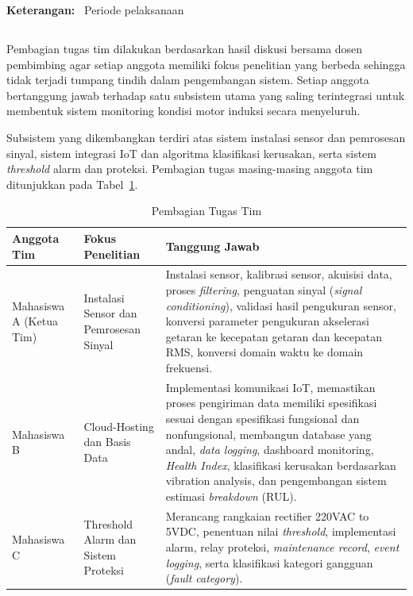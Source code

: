 \documentclass{elsinta}
\begin{document}
\noindent\textbf{Keterangan:} \colorbox{ganttblue}{\textcolor{white}{\phantom{XX}}} \, Periode pelaksanaan

\subsection{\TeamDivisionTitle}
Pembagian tugas tim dilakukan berdasarkan hasil diskusi bersama dosen pembimbing agar setiap anggota memiliki fokus penelitian yang berbeda sehingga tidak terjadi tumpang tindih dalam pengembangan sistem. Setiap anggota bertanggung jawab terhadap satu subsistem utama yang saling terintegrasi untuk membentuk sistem monitoring kondisi motor induksi secara menyeluruh.

Subsistem yang dikembangkan terdiri atas sistem instalasi sensor dan pemrosesan sinyal, sistem integrasi IoT dan algoritma klasifikasi kerusakan, serta sistem \textit{threshold} alarm dan proteksi. Pembagian tugas masing-masing anggota tim ditunjukkan pada Tabel~\ref{tab:pembagian_tugas}.

\begin{table}[H]
\centering
\caption{Pembagian Tugas Tim}
\label{tab:pembagian_tugas}


\begin{tabular}{|p{3cm}|p{4cm}|p{7cm}|}
\hline
\centering\textbf{Anggota Tim} &
\centering\textbf{Fokus Penelitian} &
\centering\arraybackslash\textbf{Tanggung Jawab}
\\
\hline

Mahasiswa A (Ketua Tim)
&
Instalasi Sensor dan Pemrosesan Sinyal
&
Instalasi sensor, kalibrasi sensor, akuisisi data, proses \textit{filtering}, penguatan sinyal (\textit{signal conditioning}), validasi hasil pengukuran sensor,
konversi parameter pengukuran akselerasi getaran ke kecepatan getaran
dan kecepatan RMS, konversi domain waktu ke domain frekuensi.
\\
\hline

Mahasiswa B
&
Cloud-Hosting dan Basis Data
&
Implementasi komunikasi IoT, memastikan proses pengiriman data memiliki spesifikasi sesuai dengan
spesifikasi fungsional dan nonfungsional, membangun database yang andal, \textit{data logging}, dashboard monitoring, \textit{Health Index}, klasifikasi kerusakan berdasarkan vibration analysis, dan pengembangan sistem estimasi \textit{breakdown} (RUL).
\\
\hline

Mahasiswa C
&
Threshold Alarm dan Sistem Proteksi
&
Merancang rangkaian rectifier 220VAC to 5VDC, penentuan nilai \textit{threshold}, implementasi alarm, relay proteksi, \textit{maintenance record}, \textit{event logging}, serta klasifikasi kategori gangguan (\textit{fault category}).
\\
\hline

\end{tabular}
\end{table}
\end{document}
